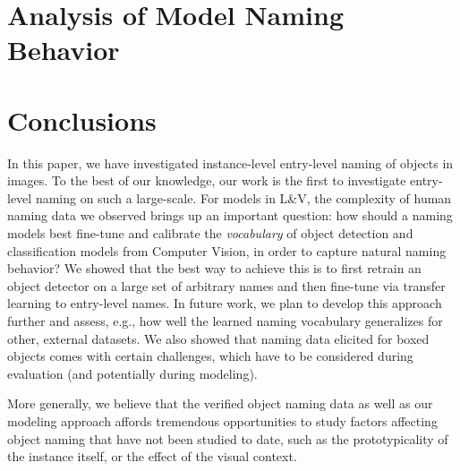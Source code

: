 \documentclass[11pt,a4paper]{article}
\newcommand{\lv}{L\&V\xspace}
\newcommand{\arbitrary}{arbitrary\xspace}
\begin{document}
\section{Analysis of Model Naming Behavior}
\label{sec:analysis}


\section{Conclusions}
\label{sec:conclusions}
In this paper, we have investigated instance-level entry-level naming of objects in images.
To the best of our knowledge, our work is the first to investigate entry-level naming on such a large-scale.
For models in \lv, the complexity of human naming data we observed brings up an important question: how should a naming models best fine-tune and calibrate the \textit{vocabulary} of object detection and classification models from Computer Vision, in order to capture natural naming behavior?
We showed that the best way to achieve this is to first retrain an object detector on a large set of \arbitrary names and then fine-tune via transfer learning to entry-level names. 
In future work, we plan to develop this approach further and assess, e.g., how well the learned naming vocabulary generalizes for other, external datasets.
We also showed that naming data elicited for boxed objects comes with certain challenges, which have to be considered during evaluation (and potentially during modeling). 

More generally, we believe that the verified object naming data as well as our modeling approach affords tremendous opportunities to study factors affecting object naming that have not been studied to date, such as the prototypicality of the instance itself, or the effect of the visual context.



%
%

%
\end{document}
